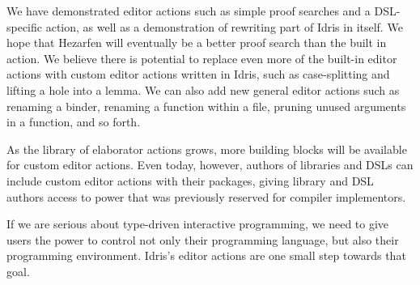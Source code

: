 We have demonstrated editor actions such as simple proof searches and
a DSL-specific action, as well as a demonstration of rewriting part of
Idris in itself. We hope that Hezarfen will eventually be a better
proof search than the built in action. We believe there is potential
to replace even more of the built-in editor actions with custom editor
actions written in Idris, such as case-splitting and lifting a hole
into a lemma. We can also add new general editor actions such as
renaming a binder, renaming a function within a file, pruning unused
arguments in a function, and so forth.

As the library of elaborator actions grows, more building blocks will
be available for custom editor actions. Even today, however, authors
of libraries and DSLs can include custom editor actions with their
packages, giving library and DSL authors access to power that was
previously reserved for compiler implementors.

If we are serious about type-driven interactive programming, we need
to give users the power to control not only their programming
language, but also their programming environment. Idris's editor
actions are one small step towards that goal.

